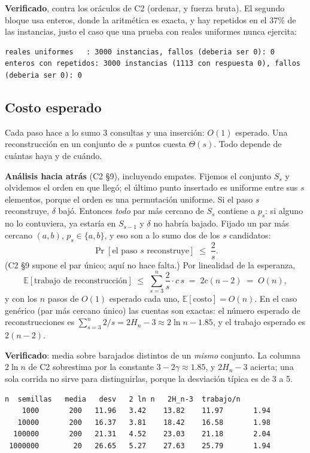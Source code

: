 \documentclass[11pt]{article}
\begin{document}
\textbf{Verificado}, contra los oráculos de C2 (ordenar, y fuerza bruta). El segundo bloque usa enteros,
donde la aritmética es exacta, y hay repetidos en el 37\% de las instancias, justo el caso que una prueba
con reales uniformes nunca ejercita:
\begin{lstlisting}[style=salida,basicstyle=\ttfamily\footnotesize\color{black}]
reales uniformes   : 3000 instancias, fallos (deberia ser 0): 0
enteros con repetidos: 3000 instancias (1113 con respuesta 0), fallos (deberia ser 0): 0
\end{lstlisting}

\subsection{Costo esperado}

Cada paso hace a lo sumo 3 consultas y una inserción: $O(1)$ esperado. Una reconstrucción en un conjunto de
$s$ puntos cuesta $\Theta(s)$. Todo depende de cuántas haya y de cuándo.

\textbf{Análisis hacia atrás} (C2 §9), incluyendo empates. Fijemos el conjunto $S_s$ y olvidemos el orden
en que llegó; el último punto insertado es uniforme entre sus $s$ elementos, porque el orden es una
permutación uniforme. Si el paso $s$ reconstruye, $\delta$ bajó. Entonces \emph{todo} par más cercano de
$S_s$ contiene a $p_s$: si alguno no lo contuviera, ya estaría en $S_{s-1}$ y $\delta$ no habría bajado.
Fijado un par más cercano $(a,b)$, $p_s\in\{a,b\}$, y eso son a lo sumo dos de los $s$ candidatos:
\[
  \Pr[\text{el paso } s \text{ reconstruye}]\;\le\;\frac{2}{s}.
\]
(C2 §9 supone el par único; aquí no hace falta.) Por linealidad de la esperanza,
\[
  \mathbb{E}[\text{trabajo de reconstrucción}]\;\le\;\sum_{s=3}^{n}\frac{2}{s}\cdot c\,s\;=\;2c(n-2)\;=\;O(n),
\]
y con los $n$ pasos de $O(1)$ esperado cada uno, $\mathbb{E}[\text{costo}]=O(n)$. En el caso genérico (par
más cercano único) las cuentas son exactas: el número esperado de reconstrucciones es
$\sum_{s=3}^{n}2/s=2H_n-3\approx2\ln n-1.85$, y el trabajo esperado es $2(n-2)$.

\textbf{Verificado}: media sobre barajados distintos de un \emph{mismo} conjunto. La columna $2\ln n$ de
C2 sobrestima por la constante $3-2\gamma\approx1.85$, y $2H_n-3$ acierta; una sola corrida no sirve para
distinguirlas, porque la desviación típica es de 3 a 5.
\begin{lstlisting}[style=salida,basicstyle=\ttfamily\footnotesize\color{black}]
       n  semillas   media   desv   2 ln n   2H_n-3  trabajo/n
    1000       200   11.96   3.42    13.82    11.97       1.94
   10000       200   16.37   3.81    18.42    16.58       1.98
  100000       200   21.31   4.52    23.03    21.18       2.04
 1000000        20   26.65   5.27    27.63    25.79       1.94
\end{lstlisting}
\end{document}
